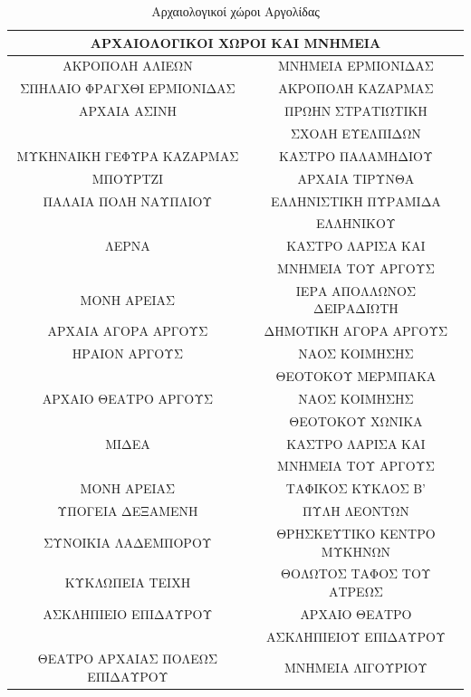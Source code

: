 \documentclass[12pt]{article}
\begin{document}
	\begin{table}[H]
		\centering
		\begin{tabular}{|c|c|}
			\hline
			\multicolumn{2}{|c|}{\textbf{ΑΡΧΑΙΟΛΟΓΙΚΟΙ ΧΩΡΟΙ ΚΑΙ ΜΝΗΜΕΙΑ}} \\ \hline
			ΑΚΡΟΠΟΛΗ ΑΛΙΕΩΝ & ΜΝΗΜΕΙΑ ΕΡΜΙΟΝΙΔΑΣ \\ \hline
			ΣΠΗΛΑΙΟ ΦΡΑΓΧΘΙ ΕΡΜΙΟΝΙΔΑΣ & ΑΚΡΟΠΟΛΗ ΚΑΖΑΡΜΑΣ \\ \hline
			ΑΡΧΑΙΑ ΑΣΙΝΗ & ΠΡΩΗΝ ΣΤΡΑΤΙΩΤΙΚΗ \\ & ΣΧΟΛΗ ΕΥΕΛΠΙΔΩΝ \\ \hline
			ΜΥΚΗΝΑΙΚΗ ΓΕΦΥΡΑ ΚΑΖΑΡΜΑΣ & ΚΑΣΤΡΟ ΠΑΛΑΜΗΔΙΟΥ \\ \hline
			ΜΠΟΥΡΤΖΙ & ΑΡΧΑΙΑ ΤΙΡΥΝΘΑ \\ \hline
			ΠΑΛΑΙΑ ΠΟΛΗ ΝΑΥΠΛΙΟΥ & ΕΛΛΗΝΙΣΤΙΚΗ ΠΥΡΑΜΙΔΑ \\ & ΕΛΛΗΝΙΚΟΥ \\ \hline
			ΛΕΡΝΑ & ΚΑΣΤΡΟ ΛΑΡΙΣΑ ΚΑΙ \\ & ΜΝΗΜΕΙΑ ΤΟΥ ΑΡΓΟΥΣ \\ \hline
			ΜΟΝΗ ΑΡΕΙΑΣ & ΙΕΡΑ ΑΠΟΛΛΩΝΟΣ ΔΕΙΡΑΔΙΩΤΗ \\ \hline
			ΑΡΧΑΙΑ ΑΓΟΡΑ ΑΡΓΟΥΣ & ΔΗΜΟΤΙΚΗ ΑΓΟΡΑ ΑΡΓΟΥΣ \\ \hline
			ΗΡΑΙΟΝ ΑΡΓΟΥΣ & ΝΑΟΣ ΚΟΙΜΗΣΗΣ \\ & ΘΕΟΤΟΚΟΥ ΜΕΡΜΠΑΚΑ \\ \hline
			ΑΡΧΑΙΟ ΘΕΑΤΡΟ ΑΡΓΟΥΣ & ΝΑΟΣ ΚΟΙΜΗΣΗΣ \\ & ΘΕΟΤΟΚΟΥ ΧΩΝΙΚΑ \\ \hline
			ΜΙΔΕΑ & ΚΑΣΤΡΟ ΛΑΡΙΣΑ ΚΑΙ \\ & ΜΝΗΜΕΙΑ ΤΟΥ ΑΡΓΟΥΣ \\ \hline
			ΜΟΝΗ ΑΡΕΙΑΣ & ΤΑΦΙΚΟΣ ΚΥΚΛΟΣ Β' \\ \hline
			ΥΠΟΓΕΙΑ ΔΕΞΑΜΕΝΗ & ΠΥΛΗ ΛΕΟΝΤΩΝ \\ \hline
			ΣΥΝΟΙΚΙΑ ΛΑΔΕΜΠΟΡΟΥ & ΘΡΗΣΚΕΥΤΙΚΟ ΚΕΝΤΡΟ ΜΥΚΗΝΩΝ \\ \hline
			ΚΥΚΛΩΠΕΙΑ ΤΕΙΧΗ & ΘΟΛΩΤΟΣ ΤΑΦΟΣ ΤΟΥ ΑΤΡΕΩΣ \\ \hline
			ΑΣΚΛΗΠΙΕΙΟ ΕΠΙΔΑΥΡΟΥ & ΑΡΧΑΙΟ ΘΕΑΤΡΟ \\ & ΑΣΚΛΗΠΙΕΙΟΥ ΕΠΙΔΑΥΡΟΥ \\ \hline
			ΘΕΑΤΡΟ ΑΡΧΑΙΑΣ ΠΟΛΕΩΣ ΕΠΙΔΑΥΡΟΥ & ΜΝΗΜΕΙΑ ΛΙΓΟΥΡΙΟΥ \\ \hline
		\end{tabular}
		\caption{Αρχαιολογικοί χώροι Αργολίδας}
		\label{The label}
	\end{table}
	
\end{document}
